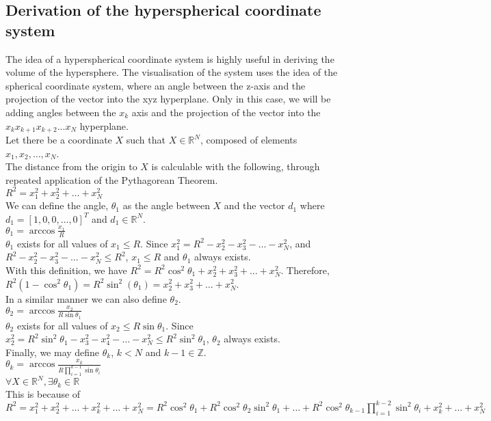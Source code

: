 \documentclass [letterpaper]{article}
\begin{document}
\subsection{\label{ss:proof_hsc}Derivation of the hyperspherical coordinate system}
The idea of a hyperspherical coordinate system is highly useful in deriving the volume of the hypersphere. The visualisation of the system uses the idea of the spherical coordinate system, where an angle between the z-axis and the projection of the vector into the xyz hyperplane. Only in this case, we will be adding angles between the $x_k$ axis and the projection of the vector into the $x_kx_{k+1}x_{k+2}...x_N$ hyperplane.\\
Let there be a coordinate $X$ such that $X\in \mathbb{R}^N$, composed of elements $x_1, x_2, \dots, x_N$.\\
The distance from the origin to $X$ is calculable with the following, through repeated application of the Pythagorean Theorem.\\
$R^2=x_1^2+x_2^2+\dots+x_N^2$\\
We can define the angle, $\theta_1$ as the angle between $X$ and the vector $d_1$ where $d_1=[1, 0, 0, \dots, 0]^T$ and $d_1\in \mathbb{R}^N$.\\
$\theta_1=\arccos\frac{x_1}{R}$\\
$\theta_1$ exists for all values of $x_1\le R$. Since $x_1^2=R^2-x_2^2-x_3^2-\dots-x_N^2$, and $R^2-x_2^2-x_3^2-\dots-x_N^2\le R^2$, $x_1\le R$ and $\theta_1$ always exists.\\
With this definition, we have $R^2=R^2\cos^2 \theta_1 +x_2^2+x_3^2+\dots+x_N^2$. Therefore, $R^2(1-\cos^2 \theta_1)=R^2\sin^2(\theta_1)=x_2^2+x_3^2+\dots+x_N^2$.\\
In a similar manner we can also define $\theta_2$.\\
$\theta_2=\arccos \frac{x_2}{R\sin\theta_1}$\\
$\theta_2$ exists for all values of $x_2 \le R\sin \theta_1$. Since $x_2^2=R^2\sin^2\theta_1-x_3^2-x_4^2-\dots-x_N^2\le R^2\sin^2\theta_1$, $\theta_2$ always exists.\\
Finally, we may define $\theta_k$, $k < N$ and $k - 1\in \mathbb{Z}$.\\
$\theta_k=\arccos\frac{x_k}{R \prod\limits_{i=1}^{k-1}\sin\theta_i}$\\
$\forall X\in \mathbb{R}^N, \exists\theta_k\in\mathbb{R}$\\
This is because of\\$R^2=x_1^2+x_2^2+\dots+x_k^2+\dots+x_N^2=R^2\cos^2\theta_1+R^2\cos^2\theta_2\sin^2\theta_1+\dots+R^2\cos^2\theta_{k-1}\prod\limits_{i=1}^{k-2}\sin^2\theta_i+x_k^2+\dots+x_N^2$\\
\end{document}
